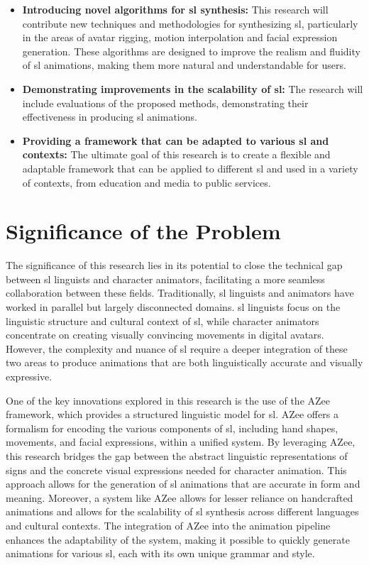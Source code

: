 \documentclass[../../main.tex]{subfiles}
\begin{document}
\begin{itemize}
    \item \textbf{Introducing novel algorithms for \gls{sl} synthesis:} This research will contribute new techniques and methodologies for synthesizing \gls{sl}, particularly in the areas of avatar rigging, motion interpolation and facial expression generation. These algorithms are designed to improve the realism and fluidity of \gls{sl} animations, making them more natural and understandable for users.
    \item \textbf{Demonstrating improvements in the scalability of \gls{sl}:} The research will include evaluations of the proposed methods, demonstrating their effectiveness in producing \gls{sl} animations.
    \item \textbf{Providing a framework that can be adapted to various \gls{sl} and contexts:} The ultimate goal of this research is to create a flexible and adaptable framework that can be applied to different \gls{sl} and used in a variety of contexts, from education and media to public services.
\end{itemize}

\section{Significance of the Problem}
\label{ch:introduction:significance}

The significance of this research lies in its potential to close the technical gap between \gls{sl} linguists and character animators, facilitating a more seamless collaboration between these fields. Traditionally, \gls{sl} linguists and animators have worked in parallel but largely disconnected domains. \gls{sl} linguists focus on the linguistic structure and cultural context of \gls{sl}, while character animators concentrate on creating visually convincing movements in digital avatars. However, the complexity and nuance of \gls{sl} require a deeper integration of these two areas to produce animations that are both linguistically accurate and visually expressive.

One of the key innovations explored in this research is the use of the AZee framework, which provides a structured linguistic model for \gls{sl}. AZee offers a formalism for encoding the various components of \gls{sl}, including hand shapes, movements, and facial expressions, within a unified system. By leveraging AZee, this research bridges the gap between the abstract linguistic representations of signs and the concrete visual expressions needed for character animation. This approach allows for the generation of \gls{sl} animations that are accurate in form and meaning.
Moreover, a system like AZee allows for lesser reliance on handcrafted animations and allows for the scalability of \gls{sl} synthesis across different languages and cultural contexts. The integration of AZee into the animation pipeline enhances the adaptability of the system, making it possible to quickly generate animations for various \gls{sl}, each with its own unique grammar and style.
\end{document}
